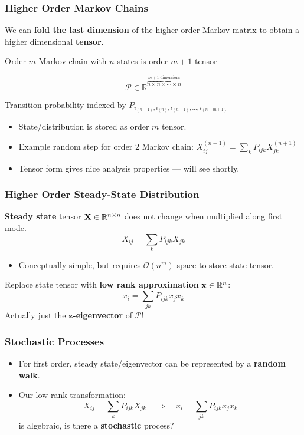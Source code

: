 \documentclass{beamer}
\begin{document}
\begin{frame}
\frametitle{Higher Order Markov Chains}

We can \textbf{fold the last dimension} of the higher-order Markov matrix to obtain a higher dimensional \textbf{tensor}.

\begin{block}{}
Order $m$ Markov chain with $n$ states is order $m+1$ tensor

\[\mathcal{P} \in \mathbb{R}^{\overbrace{n\times n\times \cdots \times n}^{m+1\text{ dimensions}}}\]

Transition probability indexed by $P_{i_{(n+1)},i_{(n)},i_{(n-1)},\ldots,i_{(n-m+1)}}$
\end{block}

\begin{itemize}
\item State/distribution is stored as order $m$ tensor.
\item Example random step for order 2 Markov chain: $X^{(n+1)}_{ij} = \sum_k P_{ijk} X^{(n+1)}_{jk}$
\item Tensor form gives nice analysis properties --- will see shortly.
\end{itemize}

\end{frame}

\begin{frame}
\frametitle{Higher Order Steady-State Distribution}

\begin{block}{}
\textbf{Steady state} tensor ${\bf X} \in \mathbb{R}^{n \times n}$ does not change when multiplied along first mode.
\[ X_{ij} = \sum_k P_{ijk} X_{jk} \]
\end{block}
\begin{itemize}
\item Conceptually simple, but requires $\mathcal{O}\left(n^m\right)$ space to store state tensor.
\end{itemize}
\begin{block}{}
Replace state tensor with \textbf{low rank approximation} ${\bf x} \in \mathbb{R}^n$:
\[ x_i = \sum_{jk} P_{ijk} x_j x_k \]
Actually just the \textbf{$\boldsymbol{z}$-eigenvector} of $\mathcal{P}$!
\end{block}

\end{frame}

\begin{frame}
\frametitle{Stochastic Processes}

\begin{itemize}
\item For first order, steady state/eigenvector can be represented by a {\bf random walk}.
\item Our low rank transformation:
\[ X_{ij} = \sum_k P_{ijk} X_{jk} \quad \Rightarrow \quad x_i = \sum_{jk} P_{ijk} x_j x_k \]
is algebraic, is there a {\bf stochastic} process?
\end{itemize}

\end{frame}
\end{document}
